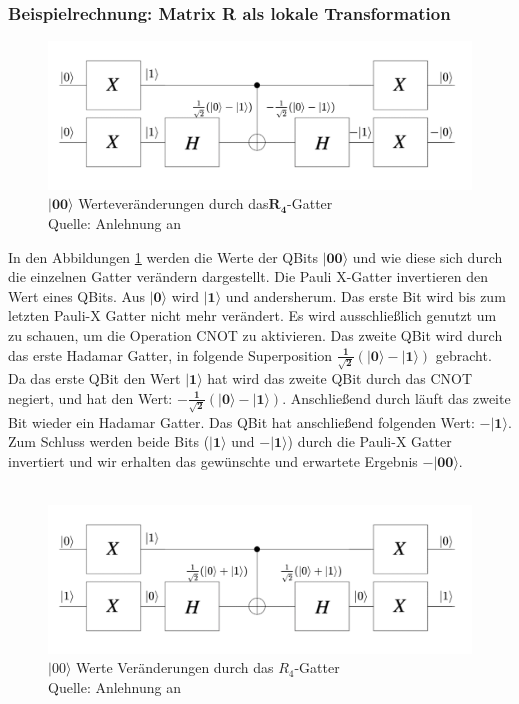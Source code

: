 \subsubsection{Beispielrechnung: Matrix R als lokale Transformation}
 \begin{figure}[hbtp]
	\centering
	\includegraphics[width=.8\textwidth]{figures/RGatter00.png}
	\caption{$\mathbf{|00\rangle}$ Werteveränderungen durch das$\mathbf{R_4}$-Gatter \\ Quelle: Anlehnung an \cite[S. 145]{Ho17}}
	\label{fig:Rgatter00}
\end{figure}
 In den Abbildungen \ref{fig:Rgatter00} werden die Werte der QBits $\mathbf{|00\rangle}$ und wie diese sich durch die einzelnen Gatter verändern dargestellt.
 Die Pauli X-Gatter invertieren den Wert eines QBits. Aus $\mathbf{|0\rangle}$ wird $\mathbf{|1\rangle}$ und andersherum. Das erste Bit wird bis zum letzten Pauli-X Gatter nicht mehr verändert. Es wird ausschließlich genutzt um zu schauen, um die Operation CNOT zu aktivieren. Das zweite QBit wird durch das erste Hadamar Gatter, in folgende Superposition $\mathbf{\frac{1}{\sqrt 2}(|0\rangle - |1\rangle)}$ gebracht. Da das erste QBit den Wert $\mathbf{|1\rangle}$ hat wird das zweite QBit durch das CNOT negiert, und hat den Wert: $\mathbf{-\frac{1}{\sqrt 2}(|0\rangle - |1\rangle)}$. Anschließend durch läuft das zweite Bit wieder ein Hadamar Gatter. Das QBit hat anschließend folgenden Wert: $\mathbf{-|1\rangle}$.
 Zum Schluss werden beide Bits ($\mathbf{|1\rangle}$ und $\mathbf{-|1\rangle}$) durch die Pauli-X Gatter invertiert und wir erhalten das gewünschte und erwartete Ergebnis $\mathbf{-|00\rangle}$.
  \\
  \\
   \begin{figure}[hbtp]
  	\centering
  	\includegraphics[width=.8\textwidth]{figures/RGatter01.png}
  	\caption{$|00\rangle$ Werte Veränderungen durch das $R_4$-Gatter \\ Quelle: Anlehnung an \cite[S. 145]{Ho17}}
  	\label{fig:Rgatter01}
  \end{figure}

